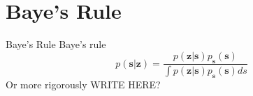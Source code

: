 \documentclass{beamer}
\begin{document}
\section{Baye's Rule}

\begin{frame}{Baye's Rule}
  Baye's rule
  \[
  p(\mathbf{s}|\mathbf{z}) =
  \frac{p(\mathbf{z}|\mathbf{s})p_{\mathbf{s}}(\mathbf{s})}{\int p(\mathbf{z}|\mathbf{s})p_{\mathbf{s}}(\mathbf{s})ds}
  \]
  Or more rigorously WRITE HERE?
\end{frame}

%
%
%
%
%
%
%
%
\end{document}
